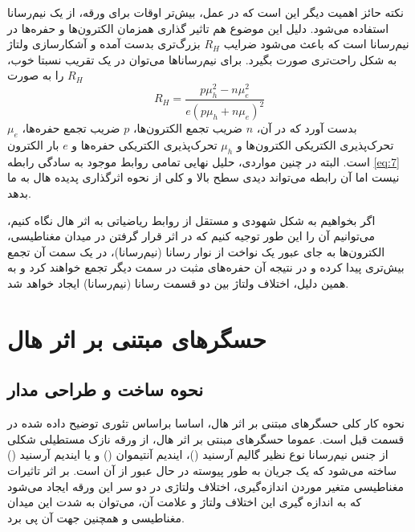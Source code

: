 \documentclass[conference]{IEEEtran-ModifiedForMVIP}
\begin{document}
نکته حائز اهمیت دیگر این است که  در عمل، بیش‌تر اوقات برای ورقه، از یک نیم‌رسانا استفاده می‌شود. دلیل این موضوع هم تاثیر گذاری همزمان الکترون‌ها و حفره‌ها در نیم‌رسانا است که باعث می‌شود ضرایب $R_H$ بزرگ‌تری بدست آمده و آشکارسازی ولتاژ به شکل راحت‌تری صورت بگیرد. برای نیم‌رسانا‌ها می‌توان در یک تقریب نسبتا خوب، $R_H$ را به صورت
\begin{equation}
	R_H = \frac{p \mu_h^2 - n \mu_e^2}{e(p\mu_h + n \mu_e)^2}
\end{equation}
بدست آورد که در آن، $n$ ضریب تجمع الکترون‌ها، $p$ ضریب تجمع حفره‌ها، $\mu_e$ تحرک‌پذیری الکتریکی الکترون‌ها و $\mu_h$ تحرک‌پذیری الکتریکی حفره‌ها و $e$ بار الکترون است. البته در چنین مواردی، حلیل نهایی تمامی روابط موجود به سادگی رابطه \eqref{eq:7} نیست اما آن رابطه می‌تواند دیدی سطح بالا و کلی از نحوه اثرگذاری پدیده هال به ما بدهد.
\cite{noauthor_hall_2021}


اگر بخواهیم به شکل  شهودی و مستقل از روابط ریاضیاتی به اثر هال نگاه کنیم، می‌توانیم آن را این طور توجیه کنیم که در اثر قرار گرفتن در میدان مغناطیسی، الکترون‌ها به جای عبور یک نواخت از نوار رسانا (نیم‌رسانا)، در یک سمت آن تجمع بیش‌تری پیدا کرده و در نتیجه آن حفره‌های مثبت در سمت دیگر تجمع خواهند کرد و به همین دلیل، اختلاف ولتاژ بین دو قسمت رسانا (نیم‌رسانا) ایجاد خواهد شد.


\section{حسگر‌های مبتنی بر اثر هال}
\subsection{نحوه ساخت و طراحی مدار}
 
 نحوه کار کلی حسگر‌های مبتنی بر اثر هال، اساسا براساس تئوری توضیح داده شده در قسمت قبل است. عموما حسگرهای مبنتی بر اثر هال، از ورقه نازک مستطیلی شکلی از جنس نیم‌رسانا نوع  نظیر گالیم آرسنید ()، ایندیم آنتیموان () و یا ایندیم آرسنید () ساخته می‌شود که یک جریان به طور پیوسته در حال عبور از آن است. بر اثر تاثیرات مغناطیسی متغیر موردن اندازه‌گیری، اختلاف ولتاژی در دو سر این ورقه ایجاد می‌شود که به اندازه گیری این اختلاف ولتاژ و علامت آن، می‌توان به شدت این میدان مغناطیسی و همچنین جهت آن پی برد.
 
\end{document}
